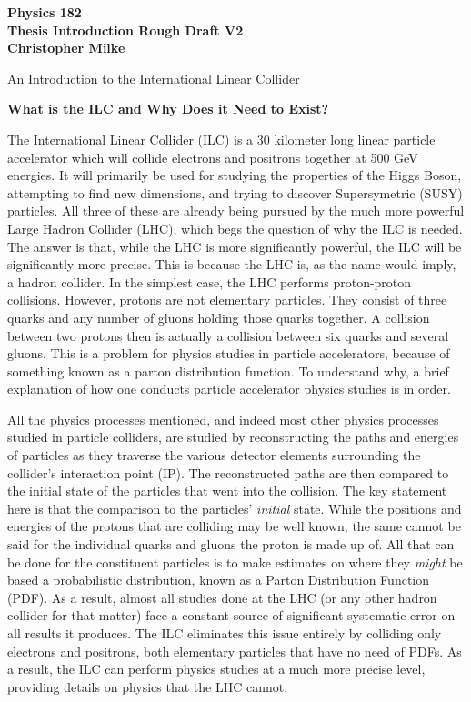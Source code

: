 \documentclass{article}
\begin{document}
    \begin{center}
        \bf{\large Physics 182 \\ Thesis Introduction Rough Draft V2 \\ Christopher Milke}
    \end{center}


    \vspace{10mm}
    \begin{center}
        \underline{ \large An Introduction to the International Linear Collider }
    \end{center}
        \begin{center} \bf{What is the ILC and Why Does it Need to Exist?} \end{center}

        The International Linear Collider (ILC) is a 30 kilometer long linear particle accelerator which will collide electrons and positrons together at 500 GeV energies. It will primarily be used for studying the properties of the Higgs Boson, attempting to find new dimensions, and trying to discover Supersymetric (SUSY) particles. All three of these are already being pursued by the much more powerful Large Hadron Collider (LHC), which begs the question of why the ILC is needed. The answer is that, while the LHC is more significantly powerful, the ILC will be significantly more precise. This is because the LHC is, as the name would imply, a hadron collider. In the simplest case, the LHC performs proton-proton collisions. However, protons are not elementary particles. They consist of three quarks and any number of gluons holding those quarks together. A collision between two protons then is actually a collision between six quarks and several gluons. This is a problem for physics studies in particle accelerators, because of something known as a parton distribution function. To understand why, a brief explanation of how one conducts particle accelerator physics studies is in order.

        All the physics processes mentioned, and indeed most other physics processes studied in particle colliders, are studied by reconstructing the paths and energies of particles as they traverse the various detector elements surrounding the collider's interaction point (IP). The reconstructed paths are then compared to the initial state of the particles that went into the collision. The key statement here is that the comparison to the particles' \textit{initial} state. While the positions and energies of the protons that are colliding may be well known, the same cannot be said for the individual quarks and gluons the proton is made up of. All that can be done for the constituent particles is to make estimates on where they \textit{might} be based a probabilistic distribution, known as a Parton Distribution Function (PDF). As a result, almost all studies done at the LHC (or any other hadron collider for that matter) face a constant source of significant systematic error on all results it produces. The ILC eliminates this issue entirely by colliding only electrons and positrons, both elementary particles that have no need of PDFs. As a result, the ILC can perform physics studies at a much more precise level, providing details on physics that the LHC cannot.
\end{document}

